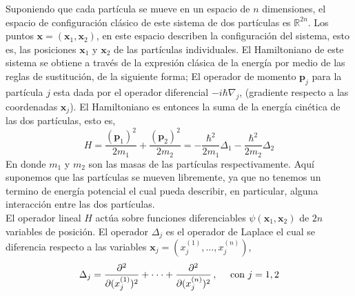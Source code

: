 \documentclass[12pt]{book}
\numberwithin{equation}{chapter}
\def\R{\mathbb{R}}
\def\x{\mathbf{x}}
\def\P{\mathbf{p}}
\begin{document}
Suponiendo que cada part\'icula se mueve en un espacio de $n$ dimensiones, el espacio de configuraci\'on cl\'asico de este sistema de dos part\'iculas es $\R^{2n}$. Los puntos $\x = ( \x_{1} , \x_{2} )$, en este espacio describen la configuraci\'on del sistema, esto es, las posiciones $\x_{1}$ y $\x_{2}$ de las part\'iculas individuales. El Hamiltoniano de este sistema se obtiene a trav\'es de la expresi\'on cl\'asica de la energ\'ia por medio de las reglas de sustituci\'on, de la siguiente forma; El operador de momento $\P_{j}$ para la part\'icula $j$ esta dada por el operador diferencial $ -i \hbar \nabla_{j} $, (gradiente respecto a las coordenadas $\x_{j}$). El Hamiltoniano es entonces la suma de la energ\'ia cin\'etica de las dos part\'iculas, esto es,
\begin{equation}\label{Ham-2p-hb}
H= \frac{ (\P_{1})^{2} }{2m_{1}} + \frac{ (\P_{2})^{2} }{2m_{2}} = - \frac{ \hbar^{2} }{2m_{1}} \Delta_{1} - \frac{ \hbar^{2} }{2m_{2}} \Delta_{2}
\end{equation}
En donde $m_{1}$ y $m_{2}$ son las masas de las part\'iculas respectivamente. Aqu\'i suponemos que las part\'iculas se mueven libremente, ya que no tenemos un termino de energ\'ia potencial el cual pueda describir, en particular, alguna interacci\'on entre las dos part\'iculas.\\
El operador lineal $H$ act\'ua sobre funciones diferenciables $\psi( \x_{1},\x_{2} )$ de $2n$ variables de posici\'on. El operador $\Delta_{j}$ es el operador de Laplace el cual se diferencia respecto a las variables $ \x_{j}= ( x_{j}^{(1)},...,x_{j}^{(n)} ) $,
$$ \Delta_{j} = \frac{ \partial^{2} }{ \partial(x_{j}^{(1)})^{2} } + \cdot \cdot \cdot + \frac{ \partial^{2} }{ \partial(x_{j}^{(n)})^{2} } \,,\,\,\,\,\,\, \hbox{ con } j=1,2 $$
\end{document}
